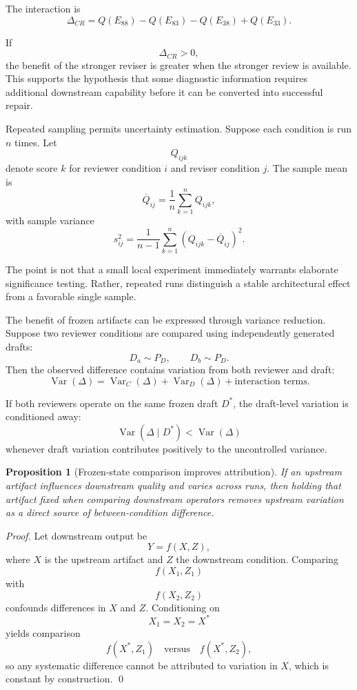 \documentclass[11pt]{article}
\newtheorem{proposition}[definition]{Proposition}
\begin{document}
The interaction is
\[
    \Delta_{CR}
    =
    Q(E_{88})
    -
    Q(E_{83})
    -
    Q(E_{38})
    +
    Q(E_{33}).
\]

If
\[
    \Delta_{CR}>0,
\]
the benefit of the stronger reviser is greater when the stronger review is available. This supports the hypothesis that some diagnostic information requires additional downstream capability before it can be converted into successful repair.

Repeated sampling permits uncertainty estimation. Suppose each condition is run \(n\) times. Let
\[
    Q_{ijk}
\]
denote score \(k\) for reviewer condition \(i\) and reviser condition \(j\). The sample mean is
\[
    \overline{Q}_{ij}
    =
    \frac{1}{n}
    \sum_{k=1}^{n}Q_{ijk},
\]
with sample variance
\[
    s_{ij}^2
    =
    \frac{1}{n-1}
    \sum_{k=1}^{n}
    \left(
        Q_{ijk}-\overline{Q}_{ij}
    \right)^2.
\]

The point is not that a small local experiment immediately warrants elaborate significance testing. Rather, repeated runs distinguish a stable architectural effect from a favorable single sample.

The benefit of frozen artifacts can be expressed through variance reduction. Suppose two reviewer conditions are compared using independently generated drafts:
\[
    D_a\sim P_D,\qquad
    D_b\sim P_D.
\]
Then the observed difference contains variation from both reviewer and draft:
\[
    \operatorname{Var}(\Delta)
    =
    \operatorname{Var}_{C}(\Delta)
    +
    \operatorname{Var}_{D}(\Delta)
    +
    \text{interaction terms}.
\]

If both reviewers operate on the same frozen draft \(D^\ast\), the draft-level variation is conditioned away:
\[
    \operatorname{Var}(\Delta\mid D^\ast)
    <
    \operatorname{Var}(\Delta)
\]
whenever draft variation contributes positively to the uncontrolled variance.

\begin{proposition}[Frozen-state comparison improves attribution]
If an upstream artifact influences downstream quality and varies across runs, then holding that artifact fixed when comparing downstream operators removes upstream variation as a direct source of between-condition difference.
\end{proposition}

\begin{proof}
Let downstream output be
\[
    Y=f(X,Z),
\]
where \(X\) is the upstream artifact and \(Z\) the downstream condition. Comparing
\[
    f(X_1,Z_1)
\]
with
\[
    f(X_2,Z_2)
\]
confounds differences in \(X\) and \(Z\). Conditioning on
\[
    X_1=X_2=X^\ast
\]
yields comparison
\[
    f(X^\ast,Z_1)
    \quad\text{versus}\quad
    f(X^\ast,Z_2),
\]
so any systematic difference cannot be attributed to variation in \(X\), which is constant by construction. \qed
\end{proof}
\end{document}
